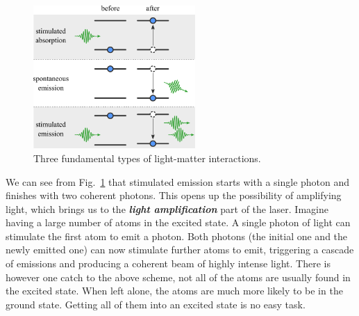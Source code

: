 \begin{figure}[t]
    \centering
    \includegraphics[width=0.55\textwidth]{lesson5/5-3_three_interactions.pdf}
    \caption[Light-matter interactions]{Three fundamental types of light-matter interactions.}
    \label{fig:5-3_light_matter_interaction}
\end{figure}

We can see from Fig.~\ref{fig:5-3_light_matter_interaction} that stimulated emission starts with a single photon and finishes with two coherent photons.
This opens up the possibility of amplifying light, which brings us to the \textbf{\emph{light amplification}} part of the laser.
Imagine having a large number of atoms in the excited state.
A single photon of light can stimulate the first atom to emit a photon.
Both photons (the initial one and the newly emitted one) can now stimulate further atoms to emit, triggering a cascade of emissions and producing a coherent beam of highly intense light. 
There is however one catch to the above scheme, not all of the atoms are usually found in the excited state.
When left alone, the atoms are much more likely to be in the ground state.
Getting all of them into an excited state is no easy task.

